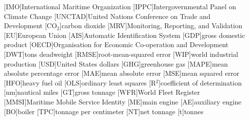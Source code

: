 




[IMO]{International Maritime Organization}
[IPPC]{Intergovernmental Panel on Climate Change}
[UNCTAD]{United Nations Conference on Trade and Development}
[CO$_2$]{carbon dioxide}
[MRV]{Monitoring, Reporting, and Validation}
[EU]{European Union}
[AIS]{Automatic Identification System}
[GDP]{gross domestic product}
[OECD]{Organisation for Economic Co-operation and Development}
[DWT]{tons deadweight}
[RMSE]{root-mean-squared error}
[WIP]{world industrial production}
[USD]{United States dollars}
[GHG]{greenhouse gas}
[MAPE]{mean absolute percentage error}
[MAE]{mean absolute error}
[MSE]{mean squared error}
[HFO]{heavy fuel oil}
[OLS]{ordinary least squares}
[R$^2$]{coefficient of determination}
[nm]{nautical miles}
[GT]{gross tonnage}
[WFR]{World Fleet Register}
[MMSI]{Maritime Mobile Service Identity}
[ME]{main engine}
[AE]{auxiliary engine}
[BO]{boiler}
[TPC]{tonnage per centimeter}
[NT]{net tonnage}
[t]{tonnes}

